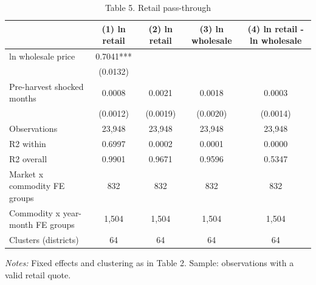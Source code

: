 \begin{table}[htbp]\centering\small
\caption{Table 5. Retail pass-through}\label{tab:table5_retail_passthrough}
\begin{tabular}{lcccc}
\toprule
 & (1) ln retail & (2) ln retail & (3) ln wholesale & (4) ln retail - ln wholesale \\
\midrule
ln wholesale price & 0.7041*** &  &  &  \\
 & (0.0132) &  &  &  \\
Pre-harvest shocked months & 0.0008 & 0.0021 & 0.0018 & 0.0003 \\
 & (0.0012) & (0.0019) & (0.0020) & (0.0014) \\
\midrule
Observations & 23,948 & 23,948 & 23,948 & 23,948 \\
R2 within & 0.6997 & 0.0002 & 0.0001 & 0.0000 \\
R2 overall & 0.9901 & 0.9671 & 0.9596 & 0.5347 \\
Market x commodity FE groups & 832 & 832 & 832 & 832 \\
Commodity x year-month FE groups & 1,504 & 1,504 & 1,504 & 1,504 \\
Clusters (districts) & 64 & 64 & 64 & 64 \\
\bottomrule
\end{tabular}
\begin{minipage}{0.95\linewidth}\footnotesize \textit{Notes:} Fixed effects and clustering as in Table 2. Sample: observations with a valid retail quote.\end{minipage}
\end{table}